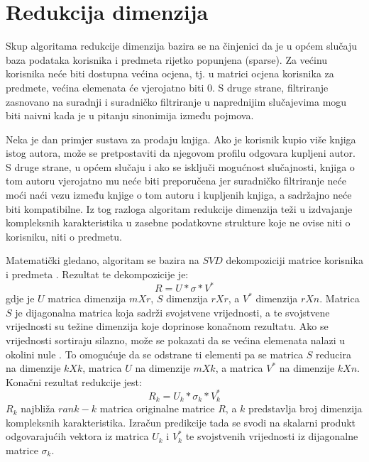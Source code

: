 \documentclass[times, utf8, diplomski, numeric]{fer}
\begin{document}
\section{Redukcija dimenzija}
Skup algoritama redukcije dimenzija bazira se na činjenici da je u općem slučaju
baza podataka korisnika i predmeta rijetko popunjena \engl(sparse). Za većinu
korisnika neće biti dostupna većina ocjena, tj. u matrici ocjena korisnika za
predmete, većina elemenata će vjerojatno biti $0$. S druge strane, filtriranje
zasnovano na suradnji i suradničko filtriranje u naprednijim slučajevima mogu
biti naivni kada je u pitanju sinonimija između pojmova. 

Neka je dan primjer sustava za prodaju knjiga. Ako je korisnik kupio više
knjiga istog autora, može se pretpostaviti da njegovom profilu odgovara kupljeni
autor. S druge strane, u općem slučaju i ako se isključi mogućnost
slučajnosti, knjiga o tom autoru vjerojatno mu neće biti preporučena jer
suradničko filtriranje neće moći naći vezu između knjige o tom autoru i
kupljenih knjiga, a sadržajno neće biti kompatibilne. Iz tog razloga algoritam
redukcije dimenzija teži u izdvajanje kompleksnih karakteristika u zasebne
podatkovne strukture koje ne ovise niti o korisniku, niti o predmetu.

Matematički gledano, algoritam se bazira na $SVD$ dekompoziciji matrice
korisnika i predmeta . Rezultat te
dekompozicije je:
\begin{equation}
	\label{eq:svd}
	R = U \ast \sigma \ast V^{\ast}
\end{equation}
gdje je $U$ matrica dimenzija $m X r$, $S$ dimenzija $r X r$, a $V^{\ast}$
dimenzija $r X n$. Matrica $S$ je dijagonalna matrica koja sadrži svojstvene
vrijednosti, a te svojstvene vrijednosti su težine dimenzija koje doprinose
konačnom rezultatu. Ako se vrijednosti sortiraju silazno, može se pokazati
da se većina elemenata nalazi u okolini nule \cite{courseraRC}. To omogućuje da
se odstrane ti elementi pa se matrica $S$ reducira na dimenzije $k X k$, matrica
$U$ na dimenzije $m X k$, a matrica $V^{\ast}$ na dimenzije $k X n$. Konačni
rezultat redukcije jest:
\begin{equation}
	\label{eq:svdred}
	R_k = U_k \ast \sigma_{k} \ast V^{\ast}_{k}
\end{equation}
$R_k$ najbliža $rank-k$ matrica originalne matrice $R$, a $k$ predstavlja broj
dimenzija kompleksnih karakteristika.
Izračun predikcije tada se svodi na skalarni produkt odgovarajućih vektora iz
matrica $U_k$ i $V^{\ast}_{k}$ te svojstvenih vrijednosti iz dijagonalne matrice
$\sigma_{k}$.
\end{document}
